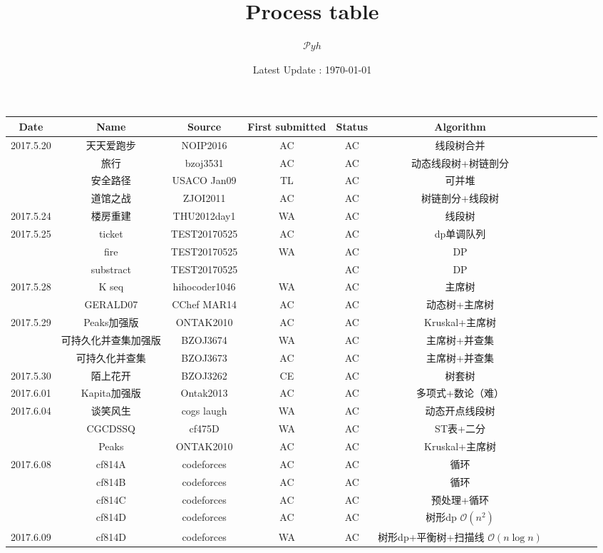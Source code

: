 \documentclass[landscape]{article}
\date{Latest Update : \today}
\title{Process table}
\author{$\mathcal Pyh$}
\begin{document}
\maketitle

\begin{longtable}{ccccccccccc}
  \hline
  Date & Name & Source & First submitted & Status & Algorithm\\
  \hline
  2017.5.20 & 天天爱跑步 & NOIP2016 & AC & AC & 线段树合并\\
   & 旅行 & bzoj3531 & AC & AC & 动态线段树+树链剖分\\
   & 安全路径 & USACO Jan09 & TL & AC & 可并堆\\
   & 道馆之战 & ZJOI2011 & AC & AC & 树链剖分+线段树\\
  \hline
  2017.5.24 & 楼房重建 & THU2012day1 & WA & AC & 线段树\\
  \hline
  2017.5.25 & ticket & TEST20170525 & AC & AC & dp单调队列\\
   & fire & TEST20170525 & WA & AC & DP\\
   & substract & TEST20170525 & & AC & DP\\
  \hline
  2017.5.28 & K seq & hihocoder1046 & WA & AC & 主席树\\
   & GERALD07 & CChef MAR14 & AC & AC & 动态树+主席树\\
  \hline
  2017.5.29 & Peaks加强版 & ONTAK2010 & AC & AC & Kruskal+主席树\\
   & 可持久化并查集加强版 & BZOJ3674 & WA & AC & 主席树+并查集\\
   & 可持久化并查集 & BZOJ3673 & AC & AC & 主席树+并查集\\
  \hline
  2017.5.30 & 陌上花开 & BZOJ3262 & CE & AC & 树套树\\
  \hline
  2017.6.01 & Kapita加强版 & Ontak2013 & AC & AC & 多项式+数论（难）\\
  \hline
  2017.6.04 & 谈笑风生 & cogs laugh & WA & AC & 动态开点线段树\\
   & CGCDSSQ & cf475D & WA & AC & ST表+二分\\
   & Peaks & ONTAK2010 & AC & AC & Kruskal+主席树\\
  \hline
  2017.6.08 & cf814A & codeforces & AC & AC & 循环\\
   & cf814B & codeforces & AC & AC & 循环\\
   & cf814C & codeforces & AC & AC & 预处理+循环\\
   & cf814D & codeforces & AC & AC & 树形dp $\mathcal O(n^2)$\\
  \hline
  2017.6.09 & cf814D & codeforces & WA & AC & 树形dp+平衡树+扫描线 $\mathcal O(n\log n)$\\

\end{longtable}
\end{document}
